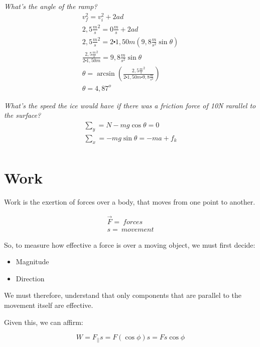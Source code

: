 \documentclass[11pt,fleqn]{book} %
\begin{document}
\textit{What's the angle of the ramp?}
\begin{gather}
    v_f^2 = v_i^2 + 2ad\\
    2,5 \frac{m}{s}^2 = 0 \frac{m}{s} + 2ad\\
    2,5 \frac{m}{s}^2 = 2 \centerdot 1,50 m (9,8 \frac{m}{s^2} \sin \theta)\\
    \frac{2,5 \frac{m}{s}^2}{2 \centerdot 1,50 m} = 9,8 \frac{m}{s^2} \sin \theta\\
    \theta = \arcsin{(\frac{2,5 \frac{m}{s}^2}{2 \centerdot 1,50 m \centerdot 9,8 \frac{m}{s^2}})}\\
    \theta = 4,87^o
\end{gather}


\textit{What's the speed the ice would have if there was a friction force of 10N rarallel to the surface?}
\begin{gather}
    \sum_{y} = N - mg \cos \theta = 0\\
    \sum_{x} = -mg \sin \theta = -ma + f_k\\
\end{gather}

\chapter{Work}

Work is the exertion of forces over a body, that moves from one point to another.

\begin{gather}
    \vec{F} = \ forces\\
    s = \  movement
\end{gather}

So, to measure how effective a force is over a moving object, we must first decide:

\begin{itemize}
    \item Magnitude
    \item Direction
\end{itemize}

We must therefore, understand that only components that are parallel to the movement itself are effective. 

Given this, we can affirm:

$$W = F_{||}s = F(\cos{\phi})s = Fs \cos{\phi} $$
\end{document}
